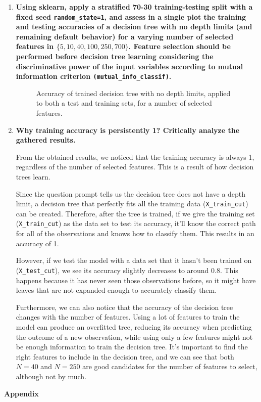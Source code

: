 \documentclass[12pt]{article}
\begin{document}
\begin{enumerate}[leftmargin=\labelsep]
    \item {\bfseries Using sklearn, apply a stratified 70-30 training-testing split with a fixed seed
          \texttt{random\_state=1}, and assess in a single plot the training and testing accuracies of
          a decision tree with no depth limits (and remaining default behavior) for a varying number
          of selected features in \(\{5,10,40,100,250,700\}\).
          Feature selection should be performed before decision tree learning considering the
          discriminative power of the input variables according to mutual information criterion
          \texttt{(mutual\_info\_classif)}.
          }

          \begin{figure}[H]
              \centering
              
              \caption{Accuracy of trained decision tree with no depth limits, applied to both a test and training sets, for a number of selected features.}
              \label{fig:ex1-plot}
          \end{figure}

    \item \textbf{Why training accuracy is persistently 1? Critically analyze the gathered results.}

          From the obtained results, we noticed that the training accuracy is always 1, regardless of the number of selected features.
          This is a result of how decision trees learn.

          Since the question prompt tells us the decision tree does not have a depth limit, a decision tree that perfectly fits all the training data (\texttt{X\_train\_cut}) can be created.
          Therefore, after the tree is trained, if we give the training set (\texttt{X\_train\_cut}) as the data set to test its accuracy, it'll know the correct path for all of the observations and knows how to classify them.
          This results in an accuracy of 1.

          However, if we test the model with a data set that it hasn't been trained on (\texttt{X\_test\_cut}), we see its accuracy slightly decreases to around 0.8.
          This happens because it has never seen those observations before, so it might have leaves that are not expanded enough to accurately classify them.

          Furthermore, we can also notice that the accuracy of the decision tree changes with the number of features.
          Using a lot of features to train the model can produce an overfitted tree, reducing its accuracy when predicting the outcome of a new observation,
          while using only a few features might not be enough information to train the decision tree.
          It's important to find the right features to include in the decision tree, and we can see that both \(N = 40\) and \(N = 250\) are good candidates for the number of features to select, although not by much.
\end{enumerate}

\center\large{\textbf{Appendix}\vskip 0.3cm}


\end{document}

